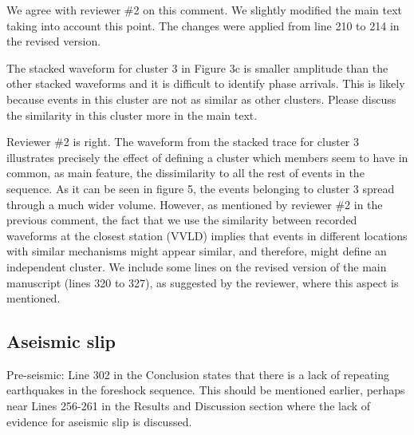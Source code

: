\documentclass[10pt]{extarticle}
\begin{document}
\begin{Answer}
We agree with reviewer \#2 on this comment. We slightly modified the main text taking into account this point. The changes were applied from line 210 to 214 in the revised version.
 \WorkInProgressRevTask
\end{Answer}
%
%



\begin{ReviewerComment}{2}
\noindent 
The stacked waveform for cluster 3 in Figure 3c is smaller amplitude than the other stacked waveforms and it is difficult to identify phase arrivals. This is likely because events in this cluster are not as similar as other clusters. Please discuss the similarity in this cluster more in the main text.

\end{ReviewerComment}


\begin{Answer}
Reviewer \#2 is right. The waveform from the stacked trace for cluster 3 illustrates precisely the effect of defining a cluster which members seem to have in common, as main feature, the dissimilarity to all the rest of events in the sequence. As it can be seen in figure 5, the events belonging to cluster 3 spread through a much wider volume. However, as mentioned by reviewer \#2 in the previous comment, the fact that we use the similarity between recorded waveforms at the closest station (VVLD) implies that events in different locations with similar mechanisms might appear similar, and therefore, might define an independent cluster. We include some lines on the revised version of the main manuscript (lines 320 to 327), as suggested by the reviewer, where this aspect is mentioned.
 \WorkInProgressRevTask
\end{Answer}
%
%


\subsection*{Aseismic slip}


\begin{ReviewerComment}{2}
\noindent 
Pre-seismic: Line 302 in the Conclusion states that there is a lack of repeating earthquakes in the foreshock sequence. This should be mentioned earlier, perhaps near Lines 256-261 in the Results and Discussion section where the lack of evidence for aseismic slip is discussed.

\end{ReviewerComment}
\end{document}
